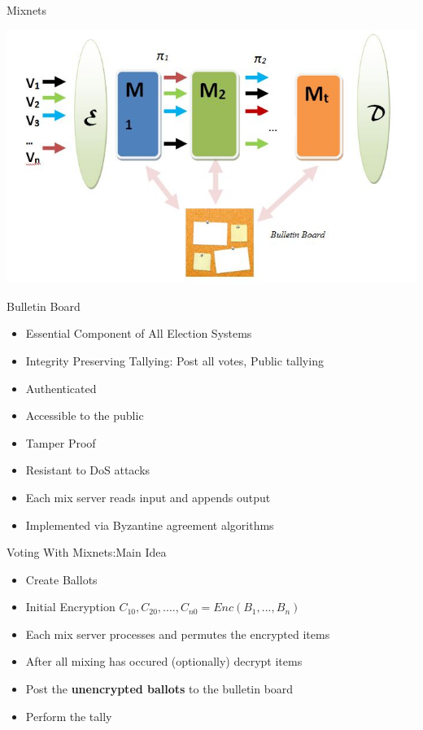 \documentclass{beamer}
\begin{document}
\begin{frame}{Mixnets}
\begin{center}
\includegraphics[scale=0.4]{mix.jpg}
\end{center}
\end{frame} 

\begin{frame}{Bulletin Board}
\begin{itemize}
\item Essential Component of All Election Systems
\item Integrity Preserving Tallying: Post all votes, Public tallying
\item Authenticated
\item Accessible to the public
\item Tamper Proof
\item Resistant to DoS attacks
\item Each mix server reads input and appends output
\item Implemented via Byzantine agreement algorithms
\end{itemize}
\end{frame}

\begin{frame}{Voting With Mixnets:Main Idea}
\begin{itemize}
\item Create Ballots
\item Initial Encryption $C_{10},C_{20},....,C_{n0} = Enc(B_1,...,B_n)$
\item Each mix server processes and permutes the encrypted items
\item After all mixing has occured (optionally) decrypt items
\item Post the \textbf{unencrypted ballots} to the bulletin board
\item Perform the tally
\end{itemize}
\end{frame} 
\end{document}
